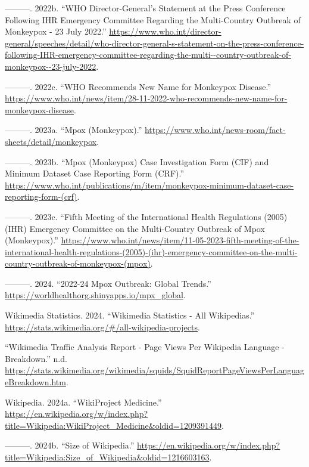 \documentclass[
  12pt,
]{article}
\newlength{\cslhangindent}
\newenvironment{CSLReferences}[2] %
 {\begin{list}{}{%
  \setlength{\itemindent}{0pt}
  \setlength{\leftmargin}{0pt}
  \setlength{\parsep}{0pt}
  \ifodd #1
   \setlength{\leftmargin}{\cslhangindent}
   \setlength{\itemindent}{-1\cslhangindent}
  \fi
  \setlength{\itemsep}{#2\baselineskip}}}
 {\end{list}}
\begin{document}
\begin{CSLReferences}{1}{0}
---------. 2022b. {``WHO Director-General's Statement at the Press
Conference Following IHR Emergency Committee Regarding the Multi-Country
Outbreak of Monkeypox - 23 July 2022.''}
\url{https://www.who.int/director-general/speeches/detail/who-director-general-s-statement-on-the-press-conference-following-IHR-emergency-committee-regarding-the-multi--country-outbreak-of-monkeypox--23-july-2022}.

---------. 2022c. {``WHO Recommends New Name for Monkeypox Disease.''}
\url{https://www.who.int/news/item/28-11-2022-who-recommends-new-name-for-monkeypox-disease}.

---------. 2023a. {``Mpox (Monkeypox).''}
\url{https://www.who.int/news-room/fact-sheets/detail/monkeypox}.

---------. 2023b. {``Mpox (Monkeypox) Case Investigation Form (CIF) and
Minimum Dataset Case Reporting Form (CRF).''}
\url{https://www.who.int/publications/m/item/monkeypox-minimum-dataset-case-reporting-form-(crf)}.

---------. 2023c. {``Fifth Meeting of the International Health
Regulations (2005) (IHR) Emergency Committee on the Multi-Country
Outbreak of Mpox (Monkeypox).''}
\url{https://www.who.int/news/item/11-05-2023-fifth-meeting-of-the-international-health-regulations-(2005)-(ihr)-emergency-committee-on-the-multi-country-outbreak-of-monkeypox-(mpox)}.

---------. 2024. {``2022-24 Mpox Outbreak: Global Trends.''}
\url{https://worldhealthorg.shinyapps.io/mpx_global}.

Wikimedia Statistics. 2024. {``Wikimedia Statistics - All Wikipedias.''}
\url{https://stats.wikimedia.org/\#/all-wikipedia-projects}.

{``Wikimedia Traffic Analysis Report - Page Views Per Wikipedia Language
- Breakdown.''} n.d.
\url{https://stats.wikimedia.org/wikimedia/squids/SquidReportPageViewsPerLanguageBreakdown.htm}.

Wikipedia. 2024a. {``WikiProject Medicine.''}
\url{https://en.wikipedia.org/w/index.php?title=Wikipedia:WikiProject_Medicine&oldid=1209391449}.

---------. 2024b. {``Size of Wikipedia.''}
\url{https://en.wikipedia.org/w/index.php?title=Wikipedia:Size_of_Wikipedia&oldid=1216603163}.


\end{CSLReferences}
\end{document}

